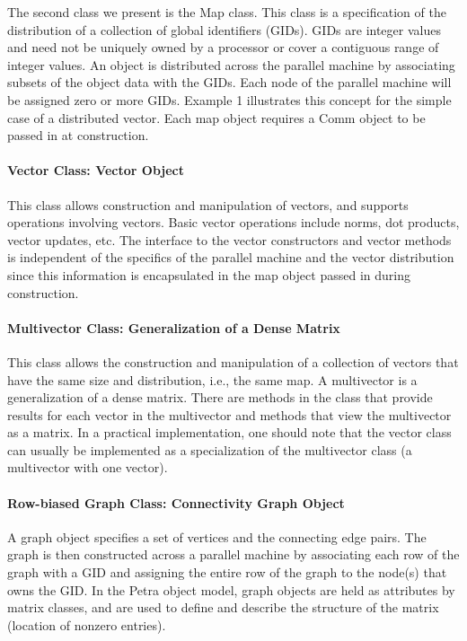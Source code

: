 \documentclass[12pt,relax]{PetraObjectModel}
\begin{document}
The second class we present is the Map class.  This class is a 
specification of the distribution of a collection of global identifiers 
(GIDs).  GIDs are integer values and need not be uniquely owned by a 
processor or cover a contiguous range of integer values.  An object is 
distributed across the parallel machine by associating subsets of the 
object data with the GIDs.  Each node of the parallel machine will be 
assigned zero or more GIDs.  Example 1 illustrates this concept for the 
simple case of a distributed vector.   Each map object requires a Comm 
object to be passed in at construction.

\paragraph{Vector Class:  Vector Object}

This class allows construction and manipulation of vectors, and supports 
operations involving vectors.  Basic vector 
operations include norms, dot products, vector updates, etc.  The interface 
to the vector constructors and vector methods is independent of the specifics 
of the parallel machine and the vector distribution since this information is 
encapsulated in the map object passed in during construction.

\paragraph{Multivector Class:  Generalization of a Dense Matrix}

This class allows the construction and manipulation of a collection of 
vectors that have the same size and distribution, i.e., the same map.  
A multivector is a generalization of a dense matrix.  There are methods 
in the class that provide results for each vector in the multivector and 
methods that view the multivector as a matrix.  In a practical implementation, 
one should note that the vector class can usually be implemented as a 
specialization of the multivector class (a multivector with one vector).

\paragraph{Row-biased Graph Class:  Connectivity Graph Object}

A graph object specifies a set of vertices and the connecting edge pairs.
The graph is then constructed across a parallel machine by associating each
row of the graph with a GID and assigning the entire row of the graph to the
node(s) that owns the GID. In the Petra object model, graph objects are held
as attributes by matrix classes, and are used to define and describe the
structure of the matrix (location of nonzero entries).
\end{document}
